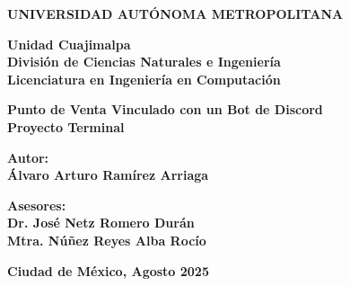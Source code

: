 \documentclass[a4paper,12pt]{article}
\begin{document}
\thispagestyle{empty}

\vspace*{-1cm}

\begin{center}
\renewcommand{\baselinestretch}{2}\selectfont
\textbf{\LARGE UNIVERSIDAD AUTÓNOMA METROPOLITANA}\\[0.7cm]
\renewcommand{\baselinestretch}{1}\selectfont

    \textbf{\LARGE Unidad Cuajimalpa}\\[0.3cm]
    \textbf{\Large División de Ciencias Naturales e Ingeniería}\\[0.3cm]
    \textbf{\Large Licenciatura en Ingeniería en Computación}\\[2cm]
\end{center}
 
\begin{center}
    \renewcommand{\baselinestretch}{2}\selectfont
        \textbf{\huge Punto de Venta Vinculado con un Bot de Discord}\\[0.7cm]
        \renewcommand{\baselinestretch}{1}\selectfont
    \textbf{\Large Proyecto Terminal}\\[3cm]
\end{center}

\begin{flushleft}
    \textbf{\Large Autor:}\\[0.3cm]
    \textbf{\Large Álvaro Arturo Ramírez Arriaga}\\[2cm]
\end{flushleft}

\begin{flushleft}
    \textbf{\Large Asesores:}\\[0.3cm]
    \textbf{\Large Dr. José Netz Romero Durán}\\[0.2cm]
    \textbf{\Large Mtra. Núñez Reyes Alba Rocío}\\[2cm]
\end{flushleft}

\vfill
\begin{center}
    \textbf{\Large Ciudad de México, Agosto 2025}
\end{center}

\newpage

\tableofcontents
\newpage
\renewcommand\thesection{\arabic{section}}%
\end{document}
